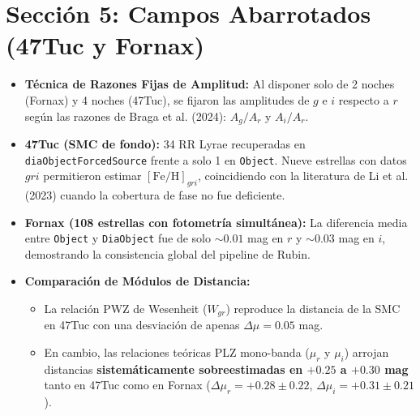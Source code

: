 \documentclass[11pt,a4paper]{article}
\begin{document}
\section{Sección 5: Campos Abarrotados (47Tuc y Fornax)}
\begin{itemize}
    \item \textbf{Técnica de Razones Fijas de Amplitud:} Al disponer solo de 2 noches (Fornax) y 4 noches (47Tuc), se fijaron las amplitudes de $g$ e $i$ respecto a $r$ según las razones de Braga et al. (2024): $A_g/A_r$ y $A_i/A_r$.
    \item \textbf{47Tuc (SMC de fondo):} 34 RR Lyrae recuperadas en \texttt{diaObjectForcedSource} frente a solo 1 en \texttt{Object}. Nueve estrellas con datos $gri$ permitieron estimar $[\text{Fe/H}]_{gri}$, coincidiendo con la literatura de Li et al. (2023) cuando la cobertura de fase no fue deficiente.
    \item \textbf{Fornax (108 estrellas con fotometría simultánea):} La diferencia media entre \texttt{Object} y \texttt{DiaObject} fue de solo $\sim0.01$ mag en $r$ y $\sim0.03$ mag en $i$, demostrando la consistencia global del pipeline de Rubin.
    \item \textbf{Comparación de Módulos de Distancia:}
    \begin{itemize}
        \item La relación PWZ de Wesenheit ($W_{gr}$) reproduce la distancia de la SMC en 47Tuc con una desviación de apenas $\Delta\mu = 0.05$ mag.
        \item En cambio, las relaciones teóricas PLZ mono-banda ($\mu_r$ y $\mu_i$) arrojan distancias \textbf{sistemáticamente sobreestimadas en $+0.25$ a $+0.30$ mag} tanto en 47Tuc como en Fornax ($\Delta\mu_r = +0.28 \pm 0.22$, $\Delta\mu_i = +0.31 \pm 0.21$).
    \end{itemize}
\end{itemize}
\end{document}
